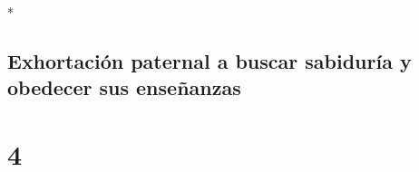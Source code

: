 \begin{paracol}{2}
\begin{otherlanguage}{english}
\end{otherlanguage}

\switchcolumn[0]*

\hypertarget{exhortaciuxf3n-paternal-a-buscar-sabiduruxeda-y-obedecer-sus-enseuxf1anzas}{%
\subsection{Exhortación paternal a buscar sabiduría y obedecer sus
enseñanzas}\label{exhortaciuxf3n-paternal-a-buscar-sabiduruxeda-y-obedecer-sus-enseuxf1anzas}}

\hypertarget{section-6}{%
\section{4}\label{section-6}}


\end{paracol}
